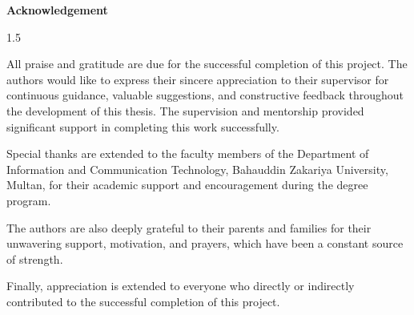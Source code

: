 
\newpage
\thispagestyle{empty}

\begin{center}
\textbf{\LARGE Acknowledgement}
\end{center}

\vspace{1cm}

\begin{spacing}{1.5}

All praise and gratitude are due for the successful completion of this project. The authors would like to express their sincere appreciation to their supervisor for continuous guidance, valuable suggestions, and constructive feedback throughout the development of this thesis. The supervision and mentorship provided significant support in completing this work successfully.

Special thanks are extended to the faculty members of the Department of Information and Communication Technology, Bahauddin Zakariya University, Multan, for their academic support and encouragement during the degree program.

The authors are also deeply grateful to their parents and families for their unwavering support, motivation, and prayers, which have been a constant source of strength.

Finally, appreciation is extended to everyone who directly or indirectly contributed to the successful completion of this project.

\end{spacing}

\newpage
